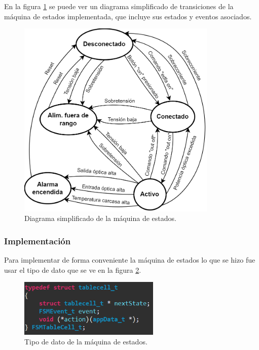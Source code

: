 En la figura \ref{fig:diagFSM} se puede ver un diagrama simplificado de transiciones de la máquina de estados implementada, que incluye sus estados y eventos asociados.

\begin{figure}[H]
\centering
\includegraphics[width=0.85\textwidth]{./Figures/diagFSM.png}
\caption{Diagrama simplificado de la máquina de estados.}
\label{fig:diagFSM}
\end{figure}

\subsubsection{Implementación}

Para implementar de forma conveniente la máquina de estados lo que se hizo fue usar el tipo de dato que se ve en la figura \ref{fig:typeFSM}.

\begin{figure}[H]
\centering
\includegraphics[width=0.6\textwidth]{./Figures/typeFSM.png}
\caption{Tipo de dato de la máquina de estados.}
\label{fig:typeFSM}
\end{figure}

